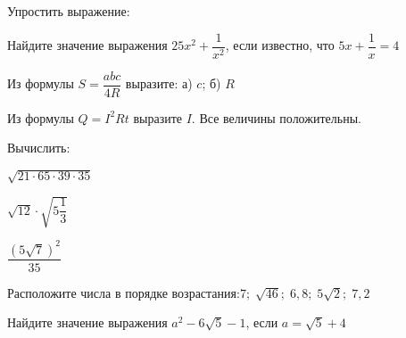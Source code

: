 \begin{listofex}
	\item Упростить выражение:
	\begin{enumcols}[itemcolumns=2]
		\item {}
		\item {}
		\item {}
		\item {}
		\item {}
		\item {}
	\end{enumcols}
	\item {}
	\item {}
	\item Найдите значение выражения \( 25x^2+\dfrac{1}{x^2} \), если известно, что \( 5x+\dfrac{1}{x}=4 \)
	\item Из формулы \( S=\dfrac{abc}{4R} \) выразите: а) \( c \); б) \( R \)
	\item Из формулы \( Q=I^2Rt \) выразите \( I \). Все величины положительны.
	\item Вычислить:
	\begin{enumcols}[itemcolumns=3]
		\item \( \sqrt{21\cdot65\cdot39\cdot35} \)
		\item \( \sqrt{12}\cdot\sqrt{5\dfrac{1}{3}} \)
		\item \( \dfrac{(5\sqrt{7})^2}{35} \)
	\end{enumcols}
	\item Расположите числа в порядке возрастания:\quad\( 7;\;\sqrt{46};\;6,8;\;5\sqrt{2};\;7,2 \)
	\item Найдите значение выражения \( a^2-6\sqrt{5}-1 \), если \( a=\sqrt{5}+4 \)
\end{listofex}
\newpage

